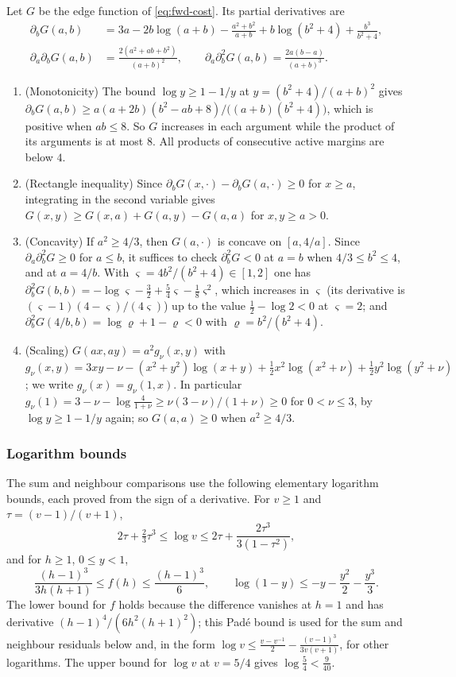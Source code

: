 Let $G$ be the edge function of \eqref{eq:fwd-cost}. Its partial derivatives are
\begin{align*}
\partial_bG(a,b)&=3a-2b\log(a+b)-\frac{a^2+b^2}{a+b}+b\log(b^2+4)+\frac{b^3}{b^2+4},\\
\partial_a\partial_bG(a,b)&=\frac{2(a^2+ab+b^2)}{(a+b)^2},\qquad
\partial_a\partial_b^2G(a,b)=\frac{2a(b-a)}{(a+b)^3}.
\end{align*}
\begin{enumerate}
\item (Monotonicity) The bound $\log y\ge1-1/y$ at $y=(b^2+4)/(a+b)^2$ gives
  $\partial_bG(a,b)\ge a(a+2b)(b^2-ab+8)/\bigl((a+b)(b^2+4)\bigr)$, which is positive when
  $ab\le8$. So $G$ increases in each argument while the product of its arguments is at most $8$.
  All products of consecutive active margins are below $4$.
\item (Rectangle inequality) Since $\partial_bG(x,\cdot)-\partial_bG(a,\cdot)\ge0$ for $x\ge a$,
  integrating in the second variable gives $G(x,y)\ge G(x,a)+G(a,y)-G(a,a)$ for $x,y\ge a>0$.
\item (Concavity) If $a^2\ge4/3$, then $G(a,\cdot)$ is concave on $[a,4/a]$. Since
  $\partial_a\partial_b^2G\ge0$ for $a\le b$, it suffices to check $\partial_b^2G<0$ at $a=b$ when
  $4/3\le b^2\le4$, and at $a=4/b$. With $\varsigma=4b^2/(b^2+4)\in[1,2]$ one has
  $\partial_b^2G(b,b)=-\log\varsigma-\frac32+\frac54\varsigma-\frac18\varsigma^2$, which increases in
  $\varsigma$ (its derivative is $(\varsigma-1)(4-\varsigma)/(4\varsigma)$) up to the value
  $\frac12-\log2<0$ at $\varsigma=2$; and $\partial_b^2G(4/b,b)=\log\varrho+1-\varrho<0$ with
  $\varrho=b^2/(b^2+4)$.
\item (Scaling) $G(ax,ay)=a^2g_\nu(x,y)$ with
  $g_\nu(x,y)=3xy-\nu-(x^2+y^2)\log(x+y)+\frac12x^2\log(x^2+\nu)+\frac12y^2\log(y^2+\nu)$; we write
  $g_\nu(x)=g_\nu(1,x)$. In particular $g_\nu(1)=3-\nu-\log\frac4{1+\nu}\ge\nu(3-\nu)/(1+\nu)\ge0$
  for $0<\nu\le3$, by $\log y\ge1-1/y$ again; so $G(a,a)\ge0$ when $a^2\ge4/3$.
\end{enumerate}

\subsubsection{Logarithm bounds}\label{app:fwd-logs}

The sum and neighbour comparisons use the following elementary logarithm bounds,
each proved from the sign of a derivative. For $v\ge1$ and $\tau=(v-1)/(v+1)$,
\[
2\tau+\tfrac23\tau^3\le\log v\le2\tau+\frac{2\tau^3}{3(1-\tau^2)},
\]
and for $h\ge1$, $0\le y<1$,
\[
\frac{(h-1)^3}{3h(h+1)}\le f(h)\le\frac{(h-1)^3}{6},\qquad
\log(1-y)\le-y-\frac{y^2}2-\frac{y^3}3 .
\]
The lower bound for $f$ holds because the difference vanishes at $h=1$ and has derivative
$(h-1)^4/(6h^2(h+1)^2)$; this Pad\'e bound is used for the sum and neighbour residuals below and, in the form
$\log v\le\frac{v-v^{-1}}2-\frac{(v-1)^3}{3v(v+1)}$, for other logarithms. The upper bound for
$\log v$ at $v=5/4$ gives $\log\frac54<\frac9{40}$.

